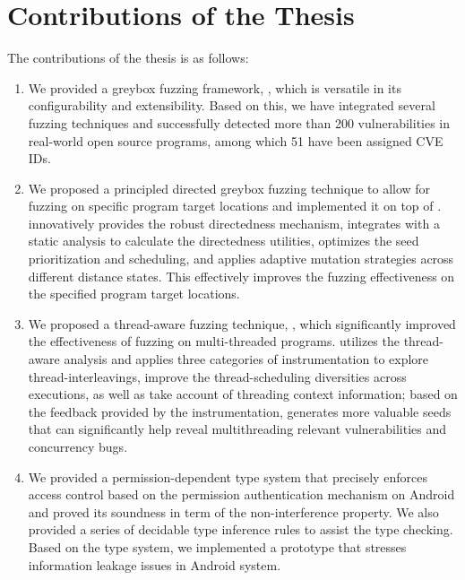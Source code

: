 \section{Contributions of the Thesis}
The contributions of the thesis is as follows:
\begin{enumerate}
	\item We provided a greybox fuzzing framework, \FOT, which is versatile in its configurability and extensibility. Based on this, we have integrated several fuzzing techniques and successfully detected more than 200 vulnerabilities in real-world open source programs, among which 51 have been assigned CVE IDs.
	\item We proposed a principled directed greybox fuzzing technique \dFOT to allow for fuzzing on specific program target locations and implemented it on top of \FOT. \dFOT innovatively provides the robust directedness mechanism, integrates with a static analysis to calculate the directedness utilities, optimizes the seed prioritization and scheduling, and applies adaptive mutation strategies across different distance states. This effectively improves the fuzzing effectiveness on the specified program target locations.
	\item We proposed a thread-aware fuzzing technique, \mtfuzz, which significantly improved the effectiveness of fuzzing on multi-threaded programs. \mtfuzz utilizes the thread-aware analysis and applies three categories of instrumentation to explore thread-interleavings,  improve the thread-scheduling diversities across executions, as well as take account of threading context information; based on the feedback provided by the instrumentation, \mtfuzz generates more valuable seeds that can significantly help reveal multithreading relevant vulnerabilities and concurrency bugs.
	\item We provided a permission-dependent type system that precisely enforces access control based on the permission authentication mechanism on Android and proved its soundness in term of the non-interference property. We also provided a series of decidable type inference rules to assist the type checking. Based on the type system, we implemented a prototype that stresses information leakage issues in Android system.
\end{enumerate}


